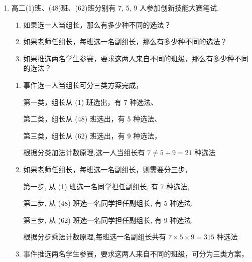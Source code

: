 \begin{enumerate}
\begin{enumerate}
\begin{jieda}
\begin{enumerate}
                一类是末位数字是 0，则有 $4 \times  3 = {12}$ (种) 排法;
                
                一类是末位数字不是 0，则末位有 2 种排法，即 2 或 4，再排首位，因 0 不能在首位，
                
                所以有 3 种排法,十位有 3 种排法,因此有 $2 \times  3 \times  3 = {18}$ (种) 排法.
                
                因此有 ${12} + {18} = {30}$ (种) 排法. 即可以排成 30 个无重复数字的三位偶数.
            \end{enumerate}
        \end{jieda}
        
        \item 高二(1)班、(48)班、(62)班分别有 7, 5, 9 人参加创新技能大赛笔试.
        \begin{enumerate}
            \item 如果选一人当组长，那么有多少种不同的选法？
            \item 如果老师任组长，每班选一名副组长，那么有多少种不同的选法？
            \item 如果推选两名学生参赛，要求这两人来自不同的班级，那么有多少种不同的选法？
        \end{enumerate}
        \begin{jieda}
            \begin{enumerate}
                \item 事件选一人当组长可分三类方案完成，
                
                第一类，组长从 (1) 班选出，有 7 种选法、
                
                第二类，组长从 (48) 班选出，有 5 种选法、
                
                第三类，组长从 (62) 班选出，有 9 种选法，
                
                根据分类加法计数原理,选一人当组长有 $7 \neq  5 + 9 = {21}$ 种选法
                \item 如果老师任组长，每班选一名副组长，则需要分三步，
                
                第一步, 从 (1) 班选一名同学担任副组长, 有 7 种选法,
                
                第二步, 从 (48) 班选一名同学担任副组长, 有 5 种选法,
                
                第三步, 从 (62) 班选一名同学担任副组长, 有 9 种选法,
                
                根据分步乘法计数原理,每班选一名副组长共有 $7 \times  5 \times  9 = {315}$ 种选法
                \item 事件推选两名学生参赛，要求这两人来自不同的班级，可分为三类方案，
                

\end{enumerate}
\end{jieda}
\end{enumerate}
\end{enumerate}
